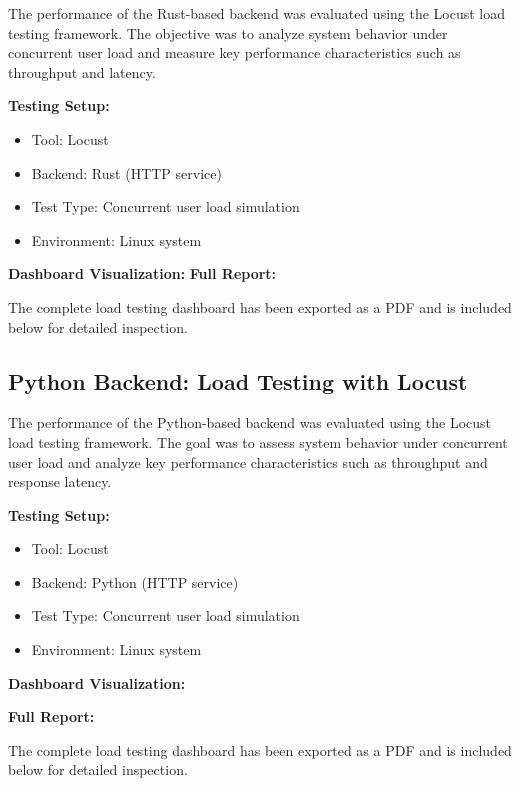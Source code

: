 \documentclass{ieeeaccess}
\begin{document}
The performance of the Rust-based backend was evaluated using the Locust load testing framework. The objective was to analyze system behavior under concurrent user load and measure key performance characteristics such as throughput and latency.

\textbf{Testing Setup:}
\begin{itemize}
    \item Tool: Locust
    \item Backend: Rust (HTTP service)
    \item Test Type: Concurrent user load simulation
    \item Environment: Linux system
\end{itemize}

\textbf{Dashboard Visualization:}
\textbf{Full Report:}

The complete load testing dashboard has been exported as a PDF and is included below for detailed inspection.





\subsection{Python Backend: Load Testing with Locust}

The performance of the Python-based backend was evaluated using the Locust load testing framework. The goal was to assess system behavior under concurrent user load and analyze key performance characteristics such as throughput and response latency.

\textbf{Testing Setup:}
\begin{itemize}
    \item Tool: Locust
    \item Backend: Python (HTTP service)
    \item Test Type: Concurrent user load simulation
    \item Environment: Linux system
\end{itemize}

\textbf{Dashboard Visualization:}

\textbf{Full Report:}

The complete load testing dashboard has been exported as a PDF and is included below for detailed inspection.


\end{document}
